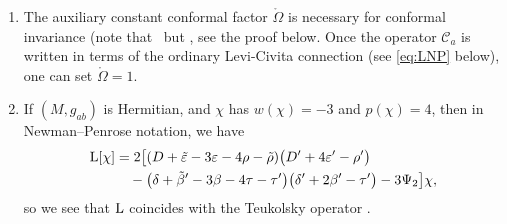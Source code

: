 \documentclass[10pt,a4paper]{amsart}
\numberwithin{equation}{section}
\begin{document}
\begin{Remark} \label{remark:OpId}
\quad
\begin{enumerate}\itemsep=0pt
\item
The auxiliary constant conformal factor $\mathring\Omega$ is necessary for conformal invariance \big(note that~ but , see the proof below. Once the operator $\mathcal{C}_{a}$ is written in terms of the ordinary Levi-Civita connection (see \eqref{eq:LNP} below), one can set $\mathring{\Omega}= 1$.
\item\label{item2-2.5}
If $(M,g_{ab})$ is Hermitian, and $\chi$ has $w(\chi)=-3$ and $p(\chi)=4$, then in Newman--Penrose notation, we have
\begin{align} \label{eq:LNP}
{\rm L}[\chi]&{}=2\bigl[(D+\tilde\varepsilon-3\varepsilon-4\rho-\tilde\rho)\bigl(D'+4\varepsilon'-\rho'\bigr) \nonumber \\
&\quad{}
 -\bigl(\delta+\tilde\beta'-3\beta-4\tau-\tau'\bigr)\bigl(\delta'+2\beta'-\tau'\bigr) - 3\Psi_2 \bigr]\chi,
\end{align}
so we see that ${\rm L}$ coincides with the Teukolsky operator \cite[equation~(2.12)]{Teukolsky1973}.
\end{enumerate}
\end{Remark}
\end{document}

